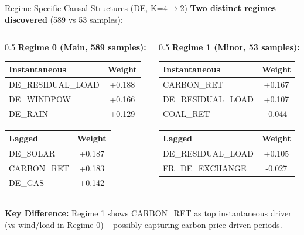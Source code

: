 \documentclass[aspectratio=169]{beamer}
\begin{document}
\begin{frame}{Regime-Specific Causal Structures (DE, K=4$\rightarrow$2)}
\textbf{Two distinct regimes discovered} (589 vs 53 samples):

\vspace{0.2cm}
\begin{columns}
\begin{column}{0.5\textwidth}
\textbf{Regime 0 (Main, 589 samples):}
\begin{table}
\scriptsize
\begin{tabular}{l|c}
\toprule
\textbf{Instantaneous} & \textbf{Weight} \\
\midrule
DE\_RESIDUAL\_LOAD & +0.188 \\
DE\_WINDPOW & +0.166 \\
DE\_RAIN & +0.129 \\
\bottomrule
\end{tabular}
\end{table}
\begin{table}
\scriptsize
\begin{tabular}{l|c}
\toprule
\textbf{Lagged} & \textbf{Weight} \\
\midrule
DE\_SOLAR & +0.187 \\
CARBON\_RET & +0.183 \\
DE\_GAS & +0.142 \\
\bottomrule
\end{tabular}
\end{table}
\end{column}

\begin{column}{0.5\textwidth}
\textbf{Regime 1 (Minor, 53 samples):}
\begin{table}
\scriptsize
\begin{tabular}{l|c}
\toprule
\textbf{Instantaneous} & \textbf{Weight} \\
\midrule
\textcolor{reprogreen}{CARBON\_RET} & +0.167 \\
DE\_RESIDUAL\_LOAD & +0.107 \\
COAL\_RET & -0.044 \\
\bottomrule
\end{tabular}
\end{table}
\begin{table}
\scriptsize
\begin{tabular}{l|c}
\toprule
\textbf{Lagged} & \textbf{Weight} \\
\midrule
DE\_RESIDUAL\_LOAD & +0.105 \\
FR\_DE\_EXCHANGE & -0.027 \\
\bottomrule
\end{tabular}
\end{table}
\end{column}
\end{columns}

\vspace{0.2cm}
\textbf{Key Difference:} Regime 1 shows \textcolor{reprogreen}{CARBON\_RET as top instantaneous driver} (vs wind/load in Regime 0) -- possibly capturing carbon-price-driven periods.
\end{frame}
\end{document}
